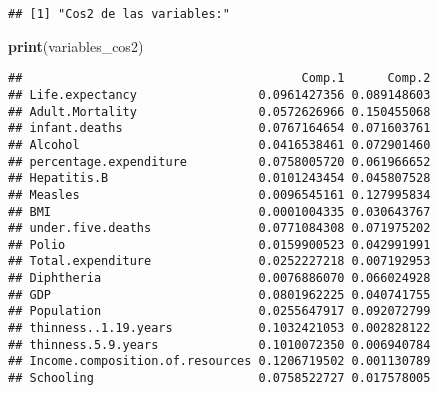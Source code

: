 \documentclass[
]{article}
\newenvironment{Shaded}{\begin{snugshade}}{\end{snugshade}}
\newcommand{\CommentTok}[1]{\textcolor[rgb]{0.56,0.35,0.01}{\textit{#1}}}
\newcommand{\DecValTok}[1]{\textcolor[rgb]{0.00,0.00,0.81}{#1}}
\newcommand{\DocumentationTok}[1]{\textcolor[rgb]{0.56,0.35,0.01}{\textbf{\textit{#1}}}}
\newcommand{\FunctionTok}[1]{\textcolor[rgb]{0.13,0.29,0.53}{\textbf{#1}}}
\newcommand{\NormalTok}[1]{#1}
\newcommand{\OtherTok}[1]{\textcolor[rgb]{0.56,0.35,0.01}{#1}}
\newcommand{\SpecialCharTok}[1]{\textcolor[rgb]{0.81,0.36,0.00}{\textbf{#1}}}
\newcommand{\StringTok}[1]{\textcolor[rgb]{0.31,0.60,0.02}{#1}}
\begin{document}
\begin{verbatim}
## [1] "Cos2 de las variables:"
\end{verbatim}

\begin{Shaded}
\begin{Highlighting}[]
\FunctionTok{print}\NormalTok{(variables\_cos2)}
\end{Highlighting}
\end{Shaded}

\begin{verbatim}
##                                       Comp.1      Comp.2
## Life.expectancy                 0.0961427356 0.089148603
## Adult.Mortality                 0.0572626966 0.150455068
## infant.deaths                   0.0767164654 0.071603761
## Alcohol                         0.0416538461 0.072901460
## percentage.expenditure          0.0758005720 0.061966652
## Hepatitis.B                     0.0101243454 0.045807528
## Measles                         0.0096545161 0.127995834
## BMI                             0.0001004335 0.030643767
## under.five.deaths               0.0771084308 0.071975202
## Polio                           0.0159900523 0.042991991
## Total.expenditure               0.0252227218 0.007192953
## Diphtheria                      0.0076886070 0.066024928
## GDP                             0.0801962225 0.040741755
## Population                      0.0255647917 0.092072799
## thinness..1.19.years            0.1032421053 0.002828122
## thinness.5.9.years              0.1010072350 0.006940784
## Income.composition.of.resources 0.1206719502 0.001130789
## Schooling                       0.0758522727 0.017578005
\end{verbatim}

\begin{Shaded}
\end{Shaded}
\end{document}
